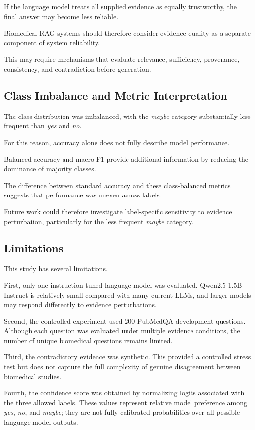 \documentclass[conference]{IEEEtran}
\begin{document}
If the language model treats all supplied evidence as equally trustworthy, the final answer may become less reliable.

Biomedical RAG systems should therefore consider evidence quality as a separate component of system reliability.

This may require mechanisms that evaluate relevance, sufficiency, provenance, consistency, and contradiction before generation.

\subsection{Class Imbalance and Metric Interpretation}

The class distribution was imbalanced, with the \textit{maybe} category substantially less frequent than \textit{yes} and \textit{no}.

For this reason, accuracy alone does not fully describe model performance.

Balanced accuracy and macro-F1 provide additional information by reducing the dominance of majority classes.

The difference between standard accuracy and these class-balanced metrics suggests that performance was uneven across labels.

Future work could therefore investigate label-specific sensitivity to evidence perturbation, particularly for the less frequent \textit{maybe} category.

\subsection{Limitations}

This study has several limitations.

First, only one instruction-tuned language model was evaluated. Qwen2.5-1.5B-Instruct is relatively small compared with many current LLMs, and larger models may respond differently to evidence perturbations.

Second, the controlled experiment used 200 PubMedQA development questions. Although each question was evaluated under multiple evidence conditions, the number of unique biomedical questions remains limited.

Third, the contradictory evidence was synthetic. This provided a controlled stress test but does not capture the full complexity of genuine disagreement between biomedical studies.

Fourth, the confidence score was obtained by normalizing logits associated with the three allowed labels. These values represent relative model preference among \textit{yes}, \textit{no}, and \textit{maybe}; they are not fully calibrated probabilities over all possible language-model outputs.
\end{document}
